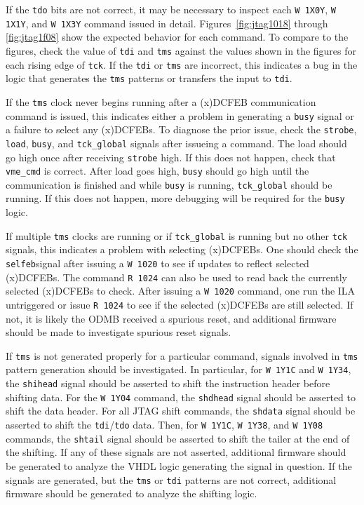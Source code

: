 \documentclass[10pt,a4paper]{article}
\begin{document}
If the \texttt{tdo} bits are not correct, it may be necessary to inspect each \texttt{W 1X0Y}, \texttt{W 1X1Y}, and \texttt{W 1X3Y} command issued in detail. Figures~\ref{fig:jtag1018} through \ref{fig:jtag1f08} show the expected behavior for each command. To compare to the figures, check the value of \texttt{tdi} and \texttt{tms} against the values shown in the figures for each rising edge of \texttt{tck}. If the \texttt{tdi} or \texttt{tms} are incorrect, this indicates a bug in the logic that generates the \texttt{tms} patterns or transfers the input to \texttt{tdi}.

If the \texttt{tms} clock never begins running after a (x)DCFEB communication command is issued, this indicates either a problem in generating a \texttt{busy} signal or a failure to select any (x)DCFEBs. To diagnose the prior issue, check the \texttt{strobe}, \texttt{load}, \texttt{busy}, and \texttt{tck\_global} signals after issueing a command. The load should go high once after receiving \texttt{strobe} high. If this does not happen, check that \texttt{vme\_cmd} is correct. After load goes high, \texttt{busy} should go high until the communication is finished and while \texttt{busy} is running, \texttt{tck\_global} should be running. If this does not happen, more debugging will be required for the \texttt{busy} logic. 

If multiple \texttt{tms} clocks are running or if \texttt{tck\_global} is running but no other \texttt{tck} signals, this indicates a problem with selecting (x)DCFEBs. One should check the \texttt{selfeb}signal after issuing a \texttt{W 1020} to see if updates to reflect selected (x)DCFEBs. The command \texttt{R 1024} can also be used to read back the currently selected (x)DCFEBs to check. After issuing a \texttt{W 1020} command, one run the ILA untriggered or issue \texttt{R 1024} to see if the selected (x)DCFEBs are still selected. If not, it is likely the ODMB received a spurious reset, and additional firmware should be made to investigate spurious reset signals.

If \texttt{tms} is not generated properly for a particular command, signals involved in \texttt{tms} pattern generation should be investigated. In particular, for \texttt{W 1Y1C} and \texttt{W 1Y34}, the \texttt{shihead} signal should be asserted to shift the instruction header before shifting data. For the \texttt{W 1Y04} command, the \texttt{shdhead} signal should be asserted to shift the data header. For all JTAG shift commands, the \texttt{shdata} signal should be asserted to shift the \texttt{tdi}/\texttt{tdo} data. Then, for \texttt{W 1Y1C}, \texttt{W 1Y38}, and \texttt{W 1Y08} commands, the \texttt{shtail} signal should be asserted to shift the tailer at the end of the shifting. If any of these signals are not asserted, additional firmware should be generated to analyze the VHDL logic generating the signal in question. If the signals are generated, but the \texttt{tms} or \texttt{tdi} patterns are not correct, additional firmware should be generated to analyze the shifting logic.
\end{document}
